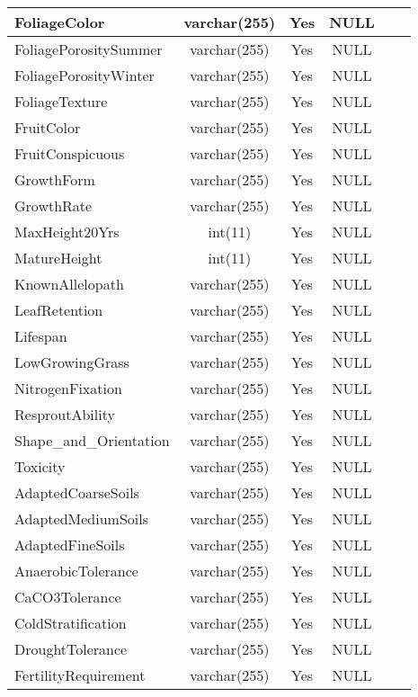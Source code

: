 \begin{enumerate}
\begin{longtable}{|l|c|c|c|l|l|}
FoliageColor & varchar(255) & Yes & NULL &  &  \\ \hline 
FoliagePorositySummer & varchar(255) & Yes & NULL &  &  \\ \hline 
FoliagePorosityWinter & varchar(255) & Yes & NULL &  &  \\ \hline 
FoliageTexture & varchar(255) & Yes & NULL &  &  \\ \hline 
FruitColor & varchar(255) & Yes & NULL &  &  \\ \hline 
FruitConspicuous & varchar(255) & Yes & NULL &  &  \\ \hline 
GrowthForm & varchar(255) & Yes & NULL &  &  \\ \hline 
GrowthRate & varchar(255) & Yes & NULL &  &  \\ \hline 
MaxHeight20Yrs & int(11) & Yes & NULL &  &  \\ \hline 
MatureHeight & int(11) & Yes & NULL &  &  \\ \hline 
KnownAllelopath & varchar(255) & Yes & NULL &  &  \\ \hline 
LeafRetention & varchar(255) & Yes & NULL &  &  \\ \hline 
Lifespan & varchar(255) & Yes & NULL &  &  \\ \hline 
LowGrowingGrass & varchar(255) & Yes & NULL &  &  \\ \hline 
NitrogenFixation & varchar(255) & Yes & NULL &  &  \\ \hline 
ResproutAbility & varchar(255) & Yes & NULL &  &  \\ \hline 
Shape\_and\_Orientation & varchar(255) & Yes & NULL &  &  \\ \hline 
Toxicity & varchar(255) & Yes & NULL &  &  \\ \hline 
AdaptedCoarseSoils & varchar(255) & Yes & NULL &  &  \\ \hline 
AdaptedMediumSoils & varchar(255) & Yes & NULL &  &  \\ \hline 
AdaptedFineSoils & varchar(255) & Yes & NULL &  &  \\ \hline 
AnaerobicTolerance & varchar(255) & Yes & NULL &  &  \\ \hline 
CaCO3Tolerance & varchar(255) & Yes & NULL &  &  \\ \hline 
ColdStratification & varchar(255) & Yes & NULL &  &  \\ \hline 
DroughtTolerance & varchar(255) & Yes & NULL &  &  \\ \hline 
FertilityRequirement & varchar(255) & Yes & NULL &  &  \\ \hline 

\end{longtable}
\end{enumerate}
